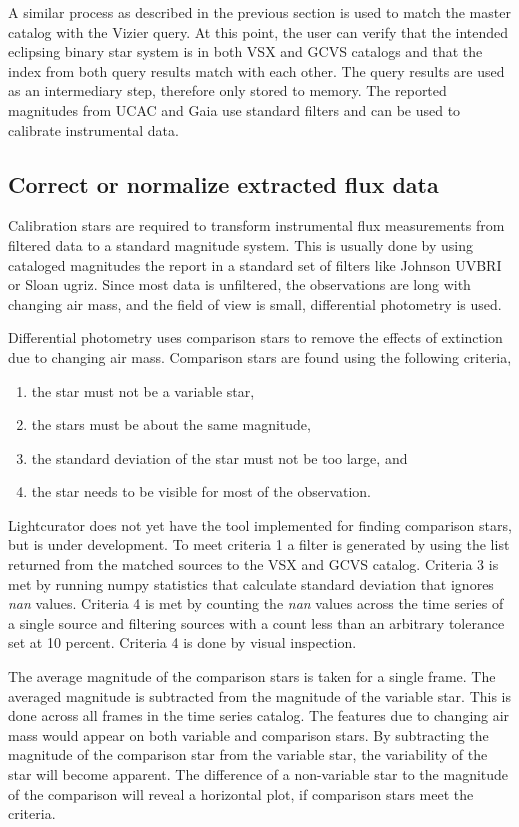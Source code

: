 A similar process as described in the previous section is used to match
the master catalog with the Vizier query.
At this point, the user can verify that the intended eclipsing binary 
star system is in both VSX and GCVS catalogs and that the index
from both query results match with each other.
The query results are used as an intermediary step, therefore only stored to memory.
The reported magnitudes from UCAC and Gaia use standard filters and can be used to calibrate instrumental data.


\subsection{Correct or normalize extracted flux data}
Calibration stars are required to transform instrumental
flux measurements from filtered data to a standard magnitude system.
This is usually done by using cataloged magnitudes the report in a standard set of filters like Johnson UVBRI or Sloan ugriz. 
Since most data is unfiltered, the observations are long with changing
air mass, and the field of view is small, differential photometry is used.

Differential photometry uses comparison stars to remove the effects of
extinction due to changing air mass.
Comparison stars are found using the following criteria, 
\begin{enumerate}
    \item the star must not be a variable star,
    \item the stars must be about the same magnitude,
    \item the standard deviation of the star must not be too large, and
    \item the star needs to be visible for most of the observation.
\end{enumerate}

Lightcurator does not yet have the tool implemented for finding comparison stars, but is under development.
To meet criteria 1 a filter is generated by using the list returned from
the matched sources to the VSX and GCVS catalog.
Criteria 3 is met by running numpy statistics that calculate standard deviation that ignores \textit{nan} values.
Criteria 4 is met by counting the \textit{nan} values across the time series of a single source and filtering
sources with a count less than an arbitrary tolerance set at 10 percent. 
Criteria 4 is done by visual inspection.

The average magnitude of the comparison stars is taken for a single frame.
The averaged magnitude is subtracted from the magnitude of the variable star.
This is done across all frames in the time series catalog.
The features due to changing air mass would appear on both variable and 
comparison stars.
By subtracting the magnitude of the comparison star from the
variable star, the variability of the star will become apparent. 
The difference of a non-variable star to the magnitude of the comparison
will reveal a horizontal plot, if comparison stars meet the criteria. 

